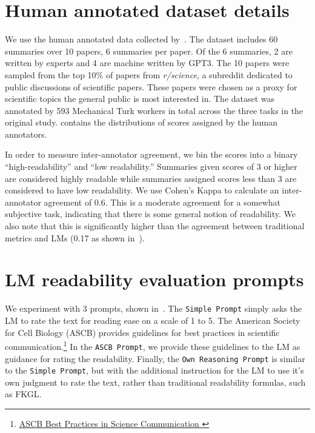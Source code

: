 \section{Human annotated dataset details}\label{appendix:dataset_details}
We use the human annotated data collected by~\textcite{August2024KnowYA}. The dataset includes 60 summaries over 10 papers, 6 summaries per paper. Of the 6 summaries, 2 are written by experts and 4 are machine written by GPT3. The 10 papers were sampled from the top 10\% of papers from \textit{r/science}, a subreddit dedicated to public discussions of scientific papers. These papers were chosen as a proxy for scientific topics the general public is most interested in. The dataset was annotated by 593 Mechanical Turk workers in total across the three tasks in the original study.
 contains the distributions of scores assigned by the human annotators.



In order to measure inter-annotator agreement, we bin the scores into a binary ``high-readability'' and ``low readability.'' Summaries given scores of 3 or higher are considered highly readable while summaries assigned scores less than 3 are considered to have low readability. We use Cohen's Kappa to calculate an inter-annotator agreement of 0.6. This is a moderate agreement for a somewhat subjective task, indicating that there is some general notion of readability. We also note that this is significantly higher than the agreement between traditional metrics and LMs (0.17 as shown in~).



\section{LM readability evaluation prompts}\label{appendix:prompt}
We experiment with 3 prompts, shown in~. The \texttt{Simple Prompt} simply asks the LM to rate the text for reading ease on a scale of 1 to 5. The American Society for Cell Biology (ASCB) provides guidelines for best practices in scientific communication.\footnote{\href{https://www.ascb.org/science-policy-public-outreach/science-outreach/communication-toolkits/best-practices-in-effective-science-communication/}{ASCB Best Practices in Science Communication
}} In the  \texttt{ASCB Prompt}, we provide these guidelines to the LM as guidance for rating the readability. Finally, the  \texttt{Own Reasoning Prompt} is similar to the  \texttt{Simple Prompt}, but with the additional instruction for the LM to use it's own judgment to rate the text, rather than traditional readability formulas, such as FKGL. 

